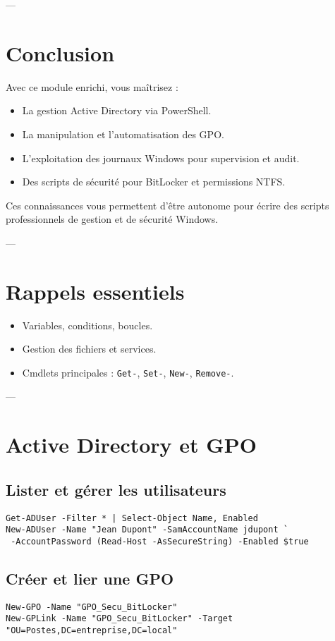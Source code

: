 \documentclass[a4paper,12pt]{article}
\begin{document}
---

\section{Conclusion}
\begin{tcolorbox}[colback=blue!5!white,colframe=blue!75!black]
Avec ce module enrichi, vous maîtrisez :
\begin{itemize}
  \item La gestion Active Directory via PowerShell.
  \item La manipulation et l’automatisation des GPO.
  \item L’exploitation des journaux Windows pour supervision et audit.
  \item Des scripts de sécurité pour BitLocker et permissions NTFS.
\end{itemize}
Ces connaissances vous permettent d’être autonome pour écrire des scripts professionnels de gestion et de sécurité Windows.
\end{tcolorbox}



---

\section{Rappels essentiels}
\begin{itemize}
  \item Variables, conditions, boucles.
  \item Gestion des fichiers et services.
  \item Cmdlets principales : \texttt{Get-}, \texttt{Set-}, \texttt{New-}, \texttt{Remove-}.
\end{itemize}

---

\section{Active Directory et GPO}
\subsection{Lister et gérer les utilisateurs}
\begin{verbatim}
Get-ADUser -Filter * | Select-Object Name, Enabled
New-ADUser -Name "Jean Dupont" -SamAccountName jdupont `
 -AccountPassword (Read-Host -AsSecureString) -Enabled $true
\end{verbatim}

\subsection{Créer et lier une GPO}
\begin{verbatim}
New-GPO -Name "GPO_Secu_BitLocker"
New-GPLink -Name "GPO_Secu_BitLocker" -Target "OU=Postes,DC=entreprise,DC=local"
\end{verbatim}
\end{document}
